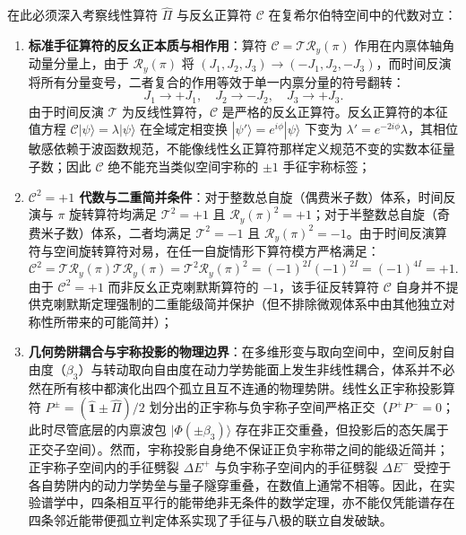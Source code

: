 在此必须深入考察线性算符 $\hat{\Pi}$ 与反幺正算符 $\mathcal{C}$ 在复希尔伯特空间中的代数对立：
\begin{enumerate}
\item \textbf{标准手征算符的反幺正本质与相作用}：算符 $\mathcal{C} = \mathcal{T} \mathcal{R}_y(\pi)$ 作用在内禀体轴角动量分量上，由于 $\mathcal{R}_y(\pi)$ 将 $(J_1, J_2, J_3) \to (-J_1, J_2, -J_3)$，而时间反演将所有分量变号，二者复合的作用等效于单一内禀分量的符号翻转：
\begin{equation}\label{eq:3-7-C-action}
J_1 \to +J_1, \quad J_2 \to -J_2, \quad J_3 \to +J_3.
\end{equation}
由于时间反演 $\mathcal{T}$ 为反线性算符，$\mathcal{C}$ 是严格的反幺正算符。反幺正算符的本征值方程 $\mathcal{C}|\psi\rangle = \lambda |\psi\rangle$ 在全域定相变换 $|\psi'\rangle = e^{i\phi}|\psi\rangle$ 下变为 $\lambda' = e^{-2i\phi}\lambda$，其相位敏感依赖于波函数规范，不能像线性幺正算符那样定义规范不变的实数本征量子数；因此 $\mathcal{C}$ 绝不能充当类似空间宇称的 $\pm 1$ 手征宇称标签；
\item \textbf{$\mathcal{C}^2 = +1$ 代数与二重简并条件}：对于整数总自旋（偶费米子数）体系，时间反演与 $\pi$ 旋转算符均满足 $\mathcal{T}^2 = +1$ 且 $\mathcal{R}_y(\pi)^2 = +1$；对于半整数总自旋（奇费米子数）体系，二者均满足 $\mathcal{T}^2 = -1$ 且 $\mathcal{R}_y(\pi)^2 = -1$。由于时间反演算符与空间旋转算符对易，在任一自旋情形下算符模方严格满足：
\begin{equation}\label{eq:3-7-C-square}
\mathcal{C}^2 = \mathcal{T} \mathcal{R}_y(\pi) \mathcal{T} \mathcal{R}_y(\pi) = \mathcal{T}^2 \mathcal{R}_y(\pi)^2 = (-1)^{2I} (-1)^{2I} = (-1)^{4I} = +1.
\end{equation}
由于 $\mathcal{C}^2 = +1$ 而非反幺正克喇默斯算符的 $-1$，该手征反转算符 $\mathcal{C}$ 自身并不提供克喇默斯定理强制的二重能级简并保护（但不排除微观体系中由其他独立对称性所带来的可能简并）；
\item \textbf{几何势阱耦合与宇称投影的物理边界}：在多维形变与取向空间中，空间反射自由度（$\beta_3$）与转动取向自由度在动力学势能面上发生非线性耦合，体系并不必然在所有核中都演化出四个孤立且互不连通的物理势阱。线性幺正宇称投影算符 $P^\pm = (\hat{\mathbf{1}} \pm \hat{\Pi})/2$ 划分出的正宇称与负宇称子空间严格正交（$P^+ P^- = 0$；此时尽管底层的内禀波包 $|\Phi(\pm\beta_3)\rangle$ 存在非正交重叠，但投影后的态矢属于正交子空间）。然而，宇称投影自身绝不保证正负宇称带之间的能级近简并；正宇称子空间内的手征劈裂 $\Delta E^+$ 与负宇称子空间内的手征劈裂 $\Delta E^-$ 受控于各自势阱内的动力学势垒与量子隧穿重叠，在数值上通常不相等。因此，在实验谱学中，四条相互平行的能带绝非无条件的数学定理，亦不能仅凭能谱存在四条邻近能带便孤立判定体系实现了手征与八极的联立自发破缺。
\end{enumerate}


